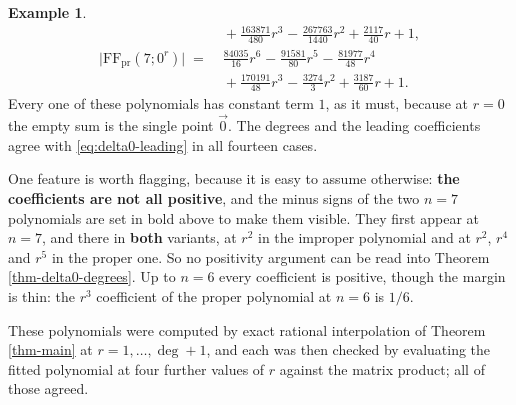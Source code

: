 \documentclass[11pt, a4paper, abstract=yes]{scrartcl}
\theoremstyle{definition}
\newtheorem{mexample}[definition]{Example}
\theoremstyle{remark}
\theoremstyle{plain}
\begin{document}
\begin{mexample}
\begin{align*}
  &{}+\tfrac{163871}{480}r^{3}\;\boldsymbol{-}\;\tfrac{267763}{1440}r^{2}
    +\tfrac{2117}{40}r+1 ,\\[0.6ex]
  \lvert\mathrm{FF}_{\mathrm{pr}}(7;0^r)\rvert\;=\;&
    \tfrac{84035}{16}r^{6}\;\boldsymbol{-}\;\tfrac{91581}{80}r^{5}
    \;\boldsymbol{-}\;\tfrac{81977}{48}r^{4}\\
  &{}+\tfrac{170191}{48}r^{3}\;\boldsymbol{-}\;\tfrac{3274}{3}r^{2}
    +\tfrac{3187}{60}r+1 .
\end{align*}
Every one of these polynomials has constant term \(1\), as it must, because at \(r=0\) the empty
sum is the single point \(\vec0\). The degrees and the leading coefficients agree with
\eqref{eq:delta0-leading} in all fourteen cases.

One feature is worth flagging, because it is easy to assume otherwise: \textbf{the coefficients are not all
positive}, and the minus signs of the two \(n=7\) polynomials are set in bold above to make them
visible. They first appear at \(n=7\), and there in
\textbf{both} variants, at \(r^2\) in the improper polynomial and at \(r^2\), \(r^4\) and \(r^5\) in the
proper one. So no positivity argument can be read into Theorem \ref{thm-delta0-degrees}. Up to \(n=6\)
every coefficient is positive, though the margin is thin: the \(r^3\) coefficient of the proper
polynomial at \(n=6\) is \(1/6\).

These polynomials were computed by exact rational interpolation of Theorem \ref{thm-main} at
\(r=1,\dots,\deg+1\), and each was then checked by evaluating the fitted polynomial at four further
values of \(r\) against the matrix product; all of those agreed.
\label{tab-delta0-polys}
\end{mexample}
\end{document}
